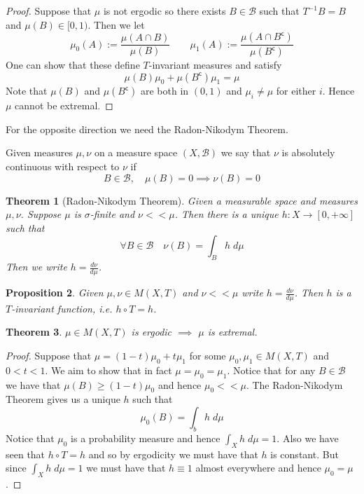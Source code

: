 \documentclass[11pt]{article}
\newcommand{\defeq}{:=}
\newcommand{\stcmp}{^{\mathsf{c}}}
\newenvironment{defin}
	{\begin{mdframed}[backgroundcolor=white, roundcorner=5pt, linewidth=1pt]}
	{\end{mdframed}}
\newcommand{\mdf}[1]{{\color{red} #1}}
\newtheorem{prop}{Proposition}[section]
\newtheorem{theorem}[prop]{Theorem}
\begin{document}
\begin{proof}
Suppose that $\mu$ is not ergodic so there exists $B\in\mathcal{B}$ such that $T^{-1}B = B$ and $\mu(B)\in [0, 1)$.
Then we let
\[
\mu_0(A)\defeq\frac{\mu(A\cap B)}{\mu(B)} \quad \quad \mu_1(A)\defeq\frac{\mu(A\cap B\stcmp)}{\mu(B\stcmp)}
\]
One can show that these define $T$-invariant measures and satisfy
\[
	\mu(B)\mu_0 + \mu(B\stcmp)\mu_1 = \mu
\]
Note that $\mu(B)$ and $\mu(B\stcmp)$ are both in $(0, 1)$ and $\mu_i\neq \mu$ for either $i$.
Hence $\mu$ cannot be extremal.
\end{proof}

For the opposite direction we need the Radon-Nikodym Theorem.

\begin{defin}
	Given measures $\mu, \nu$ on a measure space $(X, \mathcal{B})$	we say that $\nu$ is \mdf{absolutely continuous} with respect to $\nu$ if
	\[
		B\in\mathcal{B}, \quad \mu(B) = 0 \implies \nu(B) = 0
	\]
\end{defin}

\begin{theorem}[Radon-Nikodym Theorem]
Given a measurable space and measures $\mu, \nu$.
Suppose $\mu$ is $\sigma$-finite and $\nu << \mu$.
Then there is a unique $h:X\to [0, +\infty]$ such that
\[
	\forall B\in \mathcal{B} \quad \nu(B) = \int_B h \; d\mu
\]
Then we write $h=\frac{d\nu}{d\mu}$.
\end{theorem}

\begin{prop}
Given $\mu, \nu\in M(X, T)$ and $\nu << \mu$ write $h=\frac{d\nu}{d\mu}$.
Then $h$ is a $T$-invariant function, i.e. $h \circ T = h$.
\end{prop}

\begin{theorem}
$\mu \in M(X, T)$ is ergodic $\implies$ $\mu$ is extremal.
\end{theorem}

\begin{proof}
Suppose that $\mu = (1-t)\mu_0 + t\mu_1$ for some $\mu_0, \mu_1\in M(X, T)$ and $0 < t < 1$.
We aim to show that in fact $\mu=\mu_0 = \mu_1$.
Notice that for any $B\in\mathcal{B}$ we have that $\mu(B) \geq (1-t)\mu_0$ and hence $\mu_0 << \mu$.
The Radon-Nikodym Theorem gives us a unique $h$ such that
\[
	\mu_0(B) = \int_b h \; d\mu
\]
Notice that $\mu_0$ is a probability measure and hence $\int_X h \; d\mu = 1$.
Also we have seen that $h\circ T = h$ and so by ergodicity we must have that $h$ is constant.
But since $\int_X h \; d\mu=1$ we must have that $h\equiv 1 $ almost everywhere and hence $\mu_0 = \mu$.
\end{proof}
\end{document}
